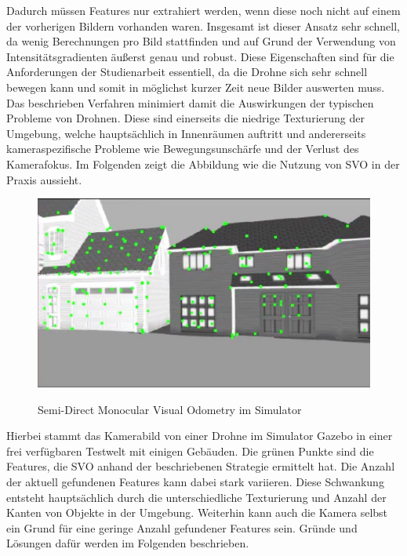 Dadurch müssen Features nur extrahiert werden, wenn diese noch nicht auf einem der vorherigen Bildern vorhanden waren. \newline
Insgesamt ist dieser Ansatz sehr schnell, da wenig Berechnungen pro Bild stattfinden und auf Grund der Verwendung von Intensitätsgradienten äußerst genau und robust. \newline
Diese Eigenschaften sind für die Anforderungen der Studienarbeit essentiell, da die Drohne sich sehr schnell bewegen kann und somit in möglichst kurzer Zeit neue Bilder auswerten muss. Das beschrieben Verfahren minimiert damit die Auswirkungen der typischen Probleme von Drohnen. Diese sind einerseits die niedrige Texturierung der Umgebung, welche hauptsächlich in Innenräumen auftritt und andererseits kameraspezifische Probleme wie Bewegungsunschärfe und der Verlust des Kamerafokus. \newline
Im Folgenden zeigt die Abbildung wie die Nutzung von SVO in der Praxis aussieht.
\begin{figure}[ht]
	\centering
	\includegraphics[scale=0.7]{Bilder/SVO.jpg}
	\label{fig:svo}
	\caption{Semi-Direct Monocular Visual Odometry im Simulator}
\end{figure}

Hierbei stammt das Kamerabild von einer Drohne im Simulator Gazebo in einer frei verfügbaren Testwelt mit einigen Gebäuden. Die grünen Punkte sind die Features, die SVO anhand der beschriebenen Strategie ermittelt hat. \newline
Die Anzahl der aktuell gefundenen Features kann dabei stark variieren. Diese Schwankung entsteht hauptsächlich durch die unterschiedliche Texturierung und Anzahl der Kanten von Objekte in der Umgebung. \newline
Weiterhin kann auch die Kamera selbst ein Grund für eine geringe Anzahl gefundener Features sein. Gründe und Lösungen dafür werden im Folgenden beschrieben.

